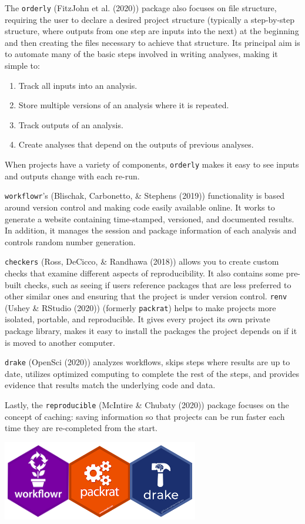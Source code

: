 \documentclass[12pt,twoside]{reedthesis}
\providecommand{\tightlist}{%
  \setlength{\itemsep}{0pt}\setlength{\parskip}{0pt}}
\begin{document}
The \texttt{orderly} (FitzJohn et al. (2020)) package also focuses on
file structure, requiring the user to declare a desired project
structure (typically a step-by-step structure, where outputs from one
step are inputs into the next) at the beginning and then creating the
files necessary to achieve that structure. Its principal aim is to
automate many of the basic steps involved in writing analyses, making it
simple to:
\begin{enumerate}
\def\labelenumi{\arabic{enumi})}
\tightlist
\item
  Track all inputs into an analysis.
\item
  Store multiple versions of an analysis where it is repeated.
\item
  Track outputs of an analysis.
\item
  Create analyses that depend on the outputs of previous analyses.
\end{enumerate}
When projects have a variety of components, \texttt{orderly} makes it
easy to see inputs and outputs change with each re-run.

\texttt{workflowr}'s (Blischak, Carbonetto, \& Stephens (2019))
functionality is based around version control and making code easily
available online. It works to generate a website containing
time-stamped, versioned, and documented results. In addition, it manages
the session and package information of each analysis and controls random
number generation.

\texttt{checkers} (Ross, DeCicco, \& Randhawa (2018)) allows you to
create custom checks that examine different aspects of reproducibility.
It also contains some pre-built checks, such as seeing if users
reference packages that are less preferred to other similar ones and
ensuring that the project is under version control. \texttt{renv} (Ushey
\& RStudio (2020)) (formerly \texttt{packrat}) helps to make projects
more isolated, portable, and reproducible. It gives every project its
own private package library, makes it easy to install the packages the
project depends on if it is moved to another computer.

\texttt{drake} (OpenSci (2020)) analyzes workflows, skips steps where
results are up to date, utilizes optimized computing to complete the
rest of the steps, and provides evidence that results match the
underlying code and data.

Lastly, the \texttt{reproducible} (McIntire \& Chubaty (2020)) package
focuses on the concept of caching: saving information so that projects
can be run faster each time they are re-completed from the start.
\begin{center}\includegraphics[width=0.5\linewidth]{figure/packages} \end{center}
\end{document}
